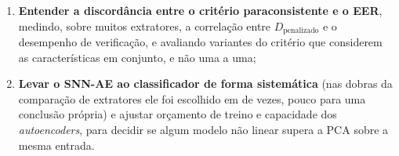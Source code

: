 \begin{enumerate}
			\item \textbf{Entender a discordância entre o critério paraconsistente
			e o \ac{EER}}, medindo, sobre muitos extratores, a correlação entre
			$D_{\text{penalizado}}$ e o desempenho de verificação, e avaliando
			variantes do critério que considerem as características em conjunto, e
			não uma a uma;

			\item \textbf{Levar o \ac{SNN}-AE ao classificador de forma sistemática} (nas dobras da comparação de extratores ele foi escolhido em  de  vezes, pouco para uma conclusão própria) e ajustar orçamento
			de treino e capacidade dos \textit{autoencoders}, para decidir se algum
			modelo não linear supera a \ac{PCA} sobre a mesma entrada.
		\end{enumerate}
